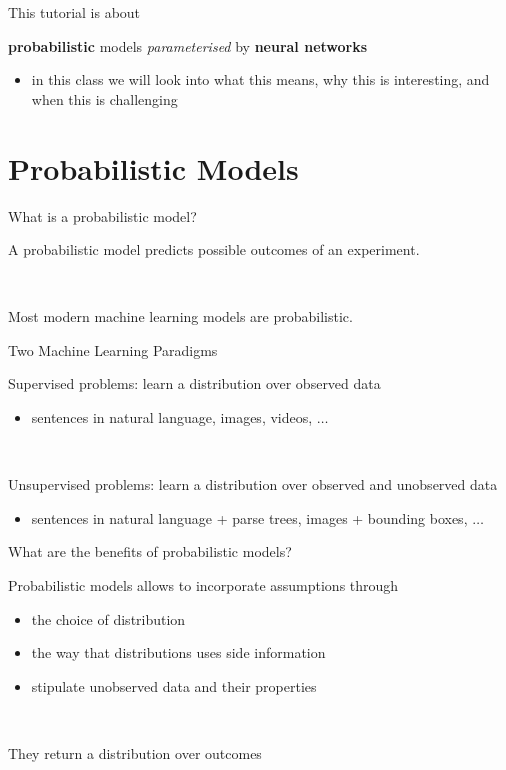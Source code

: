 
\begin{frame}{This tutorial is about}

	{\bf probabilistic} models \emph{parameterised} by {\bf neural networks}
	\begin{itemize}
		\item in this class we will look into what this means, why this is interesting, and when this is challenging
	\end{itemize}
	
	
\end{frame}

\frame{\tableofcontents}

\section{Probabilistic Models}


\begin{frame}{What is a probabilistic model?}

	A probabilistic model predicts possible outcomes of an experiment. 
	
	~
	
	Most modern machine learning models are probabilistic.	

\end{frame}

\begin{frame}{Two Machine Learning Paradigms}

	Supervised problems: \alert{learn a distribution over observed data}
	\begin{itemize}
		\item sentences in natural language, images, videos, $\ldots$
	\end{itemize}
	
	~
	
	Unsupervised problems: \alert{learn a distribution over observed and unobserved data}
	\begin{itemize}
		\item sentences in natural language + parse trees, images + bounding boxes, $\ldots$
	\end{itemize}
\end{frame}

\begin{frame}{What are the benefits of probabilistic models?}

	Probabilistic models allows to incorporate assumptions through
	\begin{itemize}
		\item the choice of distribution
		\item the way that distributions uses side information
		\item stipulate unobserved data and their properties
	\end{itemize}
	
	~
	
	They return a distribution over outcomes	
	
\end{frame}

